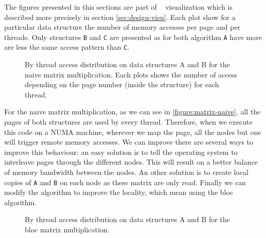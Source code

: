 The figures presented in this sections are part of \TABARNAC~ visualization
which is described more precisely in section \ref{sec:design-visu}. Each plot
show for a particular data structure the number of memory accesses per page
and per threads. Only structures \texttt{B} and \texttt{C} are presented as
for both algorithm \texttt{A} have more are less the same access pattern than
\texttt{C}.

\begin{figure}[htb]
    \centering
    \caption{By thread access distribution on data structures A and B for the
        naive matrix multiplication. Each plots shows the number of access
    depending on the page number (inside the structure) for each thread.}
    \label{fig:matrix-naive}
\end{figure}

For the naive matrix multiplication, as we can see in
\ref{figure:matrix-naive}, all the pages of both structures are used by every
thread. Therefore, when we execute this code on a NUMA machine, wherever we
map the page, all the nodes but one will trigger remote memory accesses. We
can improve there are several ways to improve this behaviour: an easy solution
is to tell the operating system to interleave pages through the different
nodes. This will result on a better balance of memory bandwidth between the
nodes. An other solution is to create local copies of \texttt{A} and
\texttt{B} on each node as these matrix are only read. Finally we can modify
the algorithm to improve the locality, which mean using the bloc algorithm.


\begin{figure}[htb]
    \centering
    \caption{By thread access distribution on data structures A and B for the
    bloc matrix multiplication.}
    \label{fig:matrix-bloc}
\end{figure}


